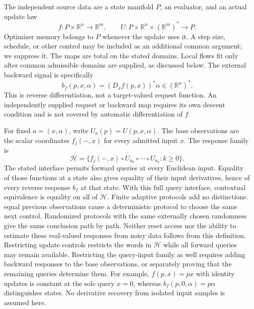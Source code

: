 \documentclass[11pt]{article}
\theoremstyle{definition}
\theoremstyle{remark}\newtheorem{remark}[theorem]{Remark}
\newcommand{\R}{\mathbb R}
\begin{document}
The independent source data are a state manifold $P$, an evaluator, and an
actual update law
\begin{equation}\label{s:eq:source}
 f:P\times\R^n\longrightarrow\R^m,
 \qquad
 U:P\times\R^n\times(\R^m)^*\longrightarrow P.
\end{equation}
Optimizer memory belongs to $P$ whenever the update uses it. A step size,
schedule, or other control may be included as an additional common argument;
we suppress it. The maps are total on the stated domains. Local flows fit
only after common admissible domains are supplied, as discussed below.
The external backward signal is specifically
\begin{equation}\label{s:eq:backward}
 b_f(p,x,\alpha)=(D_xf(p,x))^*\alpha\in(\R^n)^*.
\end{equation}
This is reverse differentiation, not a target-valued request function.
An independently supplied request or backward map requires its own descent
condition and is not covered by automatic differentiation of $f$.

For fixed $a=(x,\alpha)$, write $U_a(p)=U(p,x,\alpha)$. The base observations
are the scalar coordinates $f_j(-,x)$ for every admitted input $x$. The
response family is
\begin{equation}\label{s:eq:responses}
 \mathcal H=\{f_j(-,x)\circ U_{a_k}\circ\cdots\circ U_{a_1}:
              k\geq0\}.
\end{equation}
The stated interface permits forward queries at every Euclidean input.
Equality of those functions at a state also gives equality of their input
derivatives, hence of every reverse response $b_f$ at that state. With this
full query interface, contextual equivalence is equality on all of
$\mathcal H$. Finite adaptive protocols add no distinctions: equal previous
observations cause a deterministic protocol to choose the same next
control. Randomized protocols with the same externally chosen randomness
give the same conclusion path by path. Neither reset access nor the ability
to estimate these real-valued responses from noisy data follows from this
definition. Restricting update controls restricts the words in $\mathcal H$
while all forward queries may remain available. Restricting the query-input
family as well requires adding backward responses to the base observations,
or separately proving that the remaining queries determine them. For example,
$f(p,x)=px$ with identity updates is constant at the sole query $x=0$,
whereas $b_f(p,0,\alpha)=p\alpha$ distinguishes states. No derivative
recovery from isolated input samples is assumed here.
\end{document}
